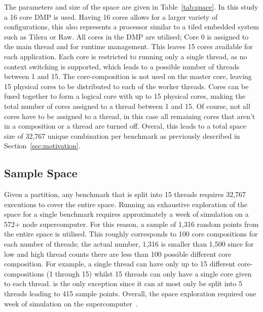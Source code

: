 The parameters and size of the space are given in Table~\ref{tab:space}.
In this study a 16 core DMP is used.
Having 16 cores allows for a larger variety of configurations, this also represents a processor similar to a tiled embedded system such as Tilera or Raw.
All cores in the DMP are utilised; Core 0 is assigned to the main thread and for runtime management.
This leaves 15 cores available for each application.
Each core is restricted to running only a single thread, as no context switching is supported, which leads to a possible number of threads between 1 and 15.
The core-composition is not used on the master core, leaving 15 physical cores to be distributed to each of the worker threads.
Cores can be fused together to form a logical core with up to 15 physical cores, making the total number of cores assigned to a thread between 1 and 15.
Of course, not all cores have to be assigned to a thread, in this case all remaining cores that aren't in a composition or a thread are turned off.
Overal, this leads to a total space size of 32,767 unique combination per benchmark as previously described in Section~\ref{sec:motivation}.

\subsection{Sample Space}


Given a partition, any benchmark that is split into 15 threads requires 32,767 executions to cover the entire space.
Running an exhaustive exploration of the space for a single benchmark requires approximately a week of simulation on a 572+ node supercomputer.
For this reason, a sample of 1,316 random points from the entire space is utilised.
This roughly corresponds to 100 core compositions for each number of threads; the actual number, 1,316 is smaller than 1,500 since for low and high thread counts there are less than 100 possible different core composition.
For example, a single thread can have only up to 15 different core-compositions (1 through 15) whilst 15 threads can only have a single core given to each thread.
 is the only exception since it can at most only be split into 5 threads leading to 415 sample points.
Overall, the space exploration required one week of simulation on the supercomputer~\cite{ecdf}.

